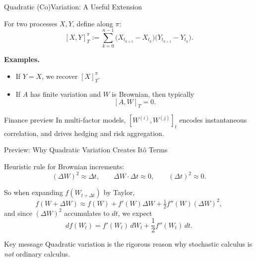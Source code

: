 \documentclass[10pt,aspectratio=169]{beamer}
\begin{document}
\begin{frame}{Quadratic (Co)Variation: A Useful Extension}

For two processes \(X,Y\), define along \(\pi\):\pause
\[
[X,Y]^{\pi}_T
:=
\sum_{k=0}^{n-1}\big(X_{t_{k+1}}-X_{t_k}\big)\big(Y_{t_{k+1}}-Y_{t_k}\big).
\]\pause

\medskip
\textbf{Examples.}\pause
\begin{itemize}
  \item If \(Y=X\), we recover \([X]^{\pi}_T\).\pause
  \item If \(A\) has finite variation and \(W\) is Brownian, then typically\pause
  \[
  [A,W]_T=0.
  \]
\end{itemize}

\medskip
\begin{block}{Finance preview}
In multi-factor models, \([W^{(i)},W^{(j)}]_t\) encodes instantaneous correlation,
and drives hedging and risk aggregation.
\end{block}

\end{frame}

\begin{frame}{Preview: Why Quadratic Variation Creates It\^o Terms}

Heuristic rule for Brownian increments:\pause
\[
(\Delta W)^2 \approx \Delta t,
\qquad
\Delta W \cdot \Delta t \approx 0,
\qquad
(\Delta t)^2 \approx 0.
\]\pause

\medskip
So when expanding \(f(W_{t+\Delta t})\) by Taylor,\pause
\[
f(W+\Delta W)
\approx
f(W) + f'(W)\Delta W + \tfrac12 f''(W)(\Delta W)^2,
\]\pause
and since \((\Delta W)^2\) accumulates to \(dt\), we expect\pause
\[
df(W_t)
=
f'(W_t)\,dW_t
+
\frac12 f''(W_t)\,dt.
\]\pause

\begin{alertblock}{Key message}
Quadratic variation is the rigorous reason why stochastic calculus
is \emph{not} ordinary calculus.
\end{alertblock}

\end{frame}
\end{document}
